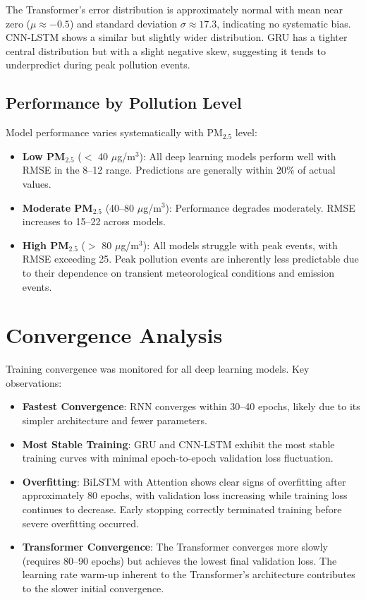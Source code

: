 The Transformer's error distribution is approximately normal with mean near zero ($\mu \approx -0.5$) and standard deviation $\sigma \approx 17.3$, indicating no systematic bias. CNN-LSTM shows a similar but slightly wider distribution. GRU has a tighter central distribution but with a slight negative skew, suggesting it tends to underpredict during peak pollution events.

\subsection{Performance by Pollution Level}

Model performance varies systematically with PM$_{2.5}$ level:

\begin{itemize}
    \item \textbf{Low PM$_{2.5}$} ($<$ 40 $\mu$g/m$^3$): All deep learning models perform well with RMSE in the 8--12 range. Predictions are generally within 20\% of actual values.
    
    \item \textbf{Moderate PM$_{2.5}$} (40--80 $\mu$g/m$^3$): Performance degrades moderately. RMSE increases to 15--22 across models.
    
    \item \textbf{High PM$_{2.5}$} ($>$ 80 $\mu$g/m$^3$): All models struggle with peak events, with RMSE exceeding 25. Peak pollution events are inherently less predictable due to their dependence on transient meteorological conditions and emission events.
\end{itemize}

\section{Convergence Analysis}

Training convergence was monitored for all deep learning models. Key observations:

\begin{itemize}
    \item \textbf{Fastest Convergence}: RNN converges within 30--40 epochs, likely due to its simpler architecture and fewer parameters.
    
    \item \textbf{Most Stable Training}: GRU and CNN-LSTM exhibit the most stable training curves with minimal epoch-to-epoch validation loss fluctuation.
    
    \item \textbf{Overfitting}: BiLSTM with Attention shows clear signs of overfitting after approximately 80 epochs, with validation loss increasing while training loss continues to decrease. Early stopping correctly terminated training before severe overfitting occurred.
    
    \item \textbf{Transformer Convergence}: The Transformer converges more slowly (requires 80--90 epochs) but achieves the lowest final validation loss. The learning rate warm-up inherent to the Transformer's architecture contributes to the slower initial convergence.
\end{itemize}

